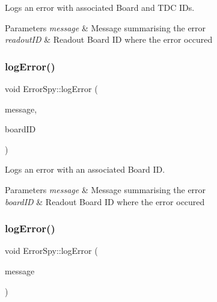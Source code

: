 Logs an error with associated Board and T\+DC I\+Ds. 


\begin{DoxyParams}{Parameters}
{\em message} & Message summarising the error \\
\hline
{\em readout\+ID} & Readout Board ID where the error occured \\
\hline
\end{DoxyParams}
\mbox{\label{class_error_spy_a64883d689d048728db1193b8b60211b4}} 
\subsubsection{\texorpdfstring{log\+Error()}{logError()}\hspace{0.1cm}{\footnotesize\ttfamily [2/3]}}
{\footnotesize\ttfamily void Error\+Spy\+::log\+Error (\begin{DoxyParamCaption}\item[{const std\+::string}]{message,  }\item[{const \hyperlink{class_board_identifier}{Board\+Identifier} \&}]{board\+ID }\end{DoxyParamCaption})}



Logs an error with an associated Board ID. 


\begin{DoxyParams}{Parameters}
{\em message} & Message summarising the error \\
\hline
{\em board\+ID} & Readout Board ID where the error occured \\
\hline
\end{DoxyParams}
\mbox{\label{class_error_spy_a6bde4e271c13b6e31c657c4417127588}} 
\subsubsection{\texorpdfstring{log\+Error()}{logError()}\hspace{0.1cm}{\footnotesize\ttfamily [3/3]}}
{\footnotesize\ttfamily void Error\+Spy\+::log\+Error (\begin{DoxyParamCaption}\item[{const std\+::string}]{message }\end{DoxyParamCaption})}



